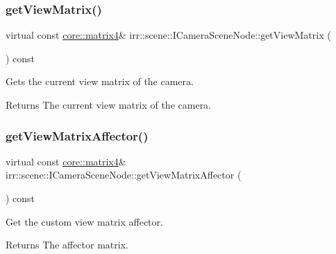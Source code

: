 \subsubsection{\texorpdfstring{get\+View\+Matrix()}{getViewMatrix()}\hspace{0.1cm}{\footnotesize\ttfamily [2/2]}}
{\footnotesize\ttfamily virtual const \hyperlink{namespaceirr_1_1core_a4c9d4e29899535971052810954a14431}{core\+::matrix4}\& irr\+::scene\+::\+I\+Camera\+Scene\+Node\+::get\+View\+Matrix (\begin{DoxyParamCaption}{ }\end{DoxyParamCaption}) const\hspace{0.3cm}{\ttfamily [pure virtual]}}



Gets the current view matrix of the camera. 

\begin{DoxyReturn}{Returns}
The current view matrix of the camera. 
\end{DoxyReturn}
\mbox{\label{classirr_1_1scene_1_1ICameraSceneNode_a033018cccdb26f94cc33256e23d764c6}} 
\subsubsection{\texorpdfstring{get\+View\+Matrix\+Affector()}{getViewMatrixAffector()}\hspace{0.1cm}{\footnotesize\ttfamily [1/2]}}
{\footnotesize\ttfamily virtual const \hyperlink{namespaceirr_1_1core_a4c9d4e29899535971052810954a14431}{core\+::matrix4}\& irr\+::scene\+::\+I\+Camera\+Scene\+Node\+::get\+View\+Matrix\+Affector (\begin{DoxyParamCaption}{ }\end{DoxyParamCaption}) const\hspace{0.3cm}{\ttfamily [pure virtual]}}



Get the custom view matrix affector. 

\begin{DoxyReturn}{Returns}
The affector matrix. 
\end{DoxyReturn}
\mbox{\label{classirr_1_1scene_1_1ICameraSceneNode_a033018cccdb26f94cc33256e23d764c6}} 

